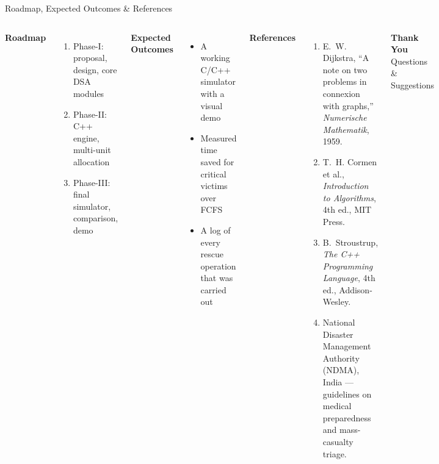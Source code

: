 \documentclass[aspectratio=169,11pt]{beamer}
\begin{document}
\begin{frame}[shrink=8]{Roadmap, Expected Outcomes \& References}
\begin{columns}[T,totalwidth=\textwidth]
\textbf{\color{GEUBlue}Roadmap}
\begin{enumerate}\itemsep2pt
\small
\item Phase-I: proposal, design, core DSA modules
\item Phase-II: C++ engine, multi-unit allocation
\item Phase-III: final simulator, comparison, demo
\end{enumerate}
\vspace{1.5mm}
\textbf{\color{GEUBlue}Expected Outcomes}
\begin{itemize}\itemsep2pt
\small
\item A working C/C++ simulator with a visual demo
\item Measured time saved for critical victims over FCFS
\item A log of every rescue operation that was carried out
\end{itemize}
\textbf{\color{GEUBlue}References}
\begin{enumerate}\itemsep2pt
\scriptsize
\item E.~W. Dijkstra, ``A note on two problems in connexion with graphs,'' \textit{Numerische Mathematik}, 1959.
\item T.~H. Cormen et al., \textit{Introduction to Algorithms}, 4th ed., MIT Press.
\item B.~Stroustrup, \textit{The C++ Programming Language}, 4th ed., Addison-Wesley.
\item National Disaster Management Authority (NDMA), India --- guidelines on medical preparedness and mass-casualty triage.
\end{enumerate}
\vspace{1mm}
\begin{center}
\colorbox{GEUBlue}{\parbox{.80\textwidth}{\centering\color{white}\textbf{Thank You}\\Questions \& Suggestions}}
\end{center}
\end{columns}
\end{frame}
\end{document}
